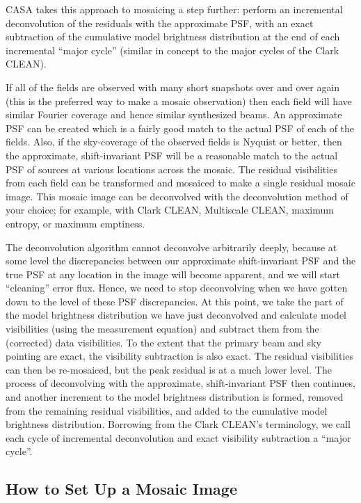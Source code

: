 CASA takes this approach to mosaicing a step further: perform
an incremental deconvolution of the residuals with the approximate PSF,
with an exact subtraction of the cumulative model brightness
distribution at the end of each incremental ``major cycle''
(similar in concept to the major cycles of the Clark CLEAN).

If all of the fields are observed with many short snapshots over and
over again (this is the preferred way to make a mosaic observation)
then each field will have similar Fourier coverage and hence similar
synthesized beams.  An approximate PSF can be created which is a
fairly good match to the actual PSF of each of the fields.  Also, if
the sky-coverage of the observed fields is Nyquist or better, then the
approximate, shift-invariant PSF will be a reasonable match to the
actual PSF of sources at various locations across the mosaic.  The
residual visibilities from each field can be transformed and mosaiced
to make a single residual mosaic image.  This mosaic image can be
deconvolved with the deconvolution method of your choice; for example,
with Clark CLEAN, Multiscale CLEAN, maximum entropy, or maximum
emptiness.

The deconvolution algorithm cannot deconvolve arbitrarily deeply,
because at some level the discrepancies between our approximate
shift-invariant PSF and the true PSF at any location in the image will
become apparent, and we will start ``cleaning'' error flux.  Hence, we
need to stop deconvolving when we have gotten down to the level of
these PSF discrepancies.  At this point, we take the part of the model
brightness distribution we have just deconvolved and calculate model
visibilities (using the measurement equation) and subtract them from
the (corrected) data visibilities.  To the extent that the primary
beam and sky pointing are exact, the visibility subtraction is also
exact.  The residual visibilities can then be re-mosaiced, but the
peak residual is at a much lower level.  The process of deconvolving
with the approximate, shift-invariant PSF then continues, and another
increment to the model brightness distribution is formed, removed from
the remaining residual visibilities, and added to the cumulative model
brightness distribution.  Borrowing from the Clark CLEAN's
terminology, we call each cycle of incremental deconvolution and exact
visibility subtraction a ``major cycle''.

\subsection{How to Set Up a Mosaic Image}
\label{section:imtool.mosaic.set}

